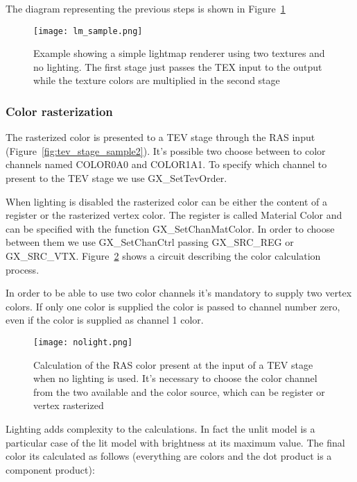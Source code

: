 \documentclass[12pt]{article}
\newcommand{\fname}[1] {{\color{blue}#1}}
\begin{document}
The diagram representing the previous steps is shown in Figure~\ref{fig:lm_sample}


\begin{figure}[ht]
\centering
\texttt{[image: lm\_sample.png]}
\caption{Example showing a simple lightmap renderer using two textures and no lighting. The first stage just passes the TEX input to the output while the texture colors are multiplied in the second stage}
\label{fig:lm_sample}
\end {figure}

\pagebreak
\subsubsection{ Color rasterization }

The rasterized color is presented to a TEV stage through the RAS input (Figure~\ref{fig:tev_stage_sample2}). It's possible two choose between to color channels named COLOR0A0 and COLOR1A1. To specify which channel to present to the TEV stage we use \fname{GX\_SetTevOrder}.

When lighting is disabled the rasterized color can be either the content of a register or the rasterized vertex color. The register is called Material Color and can be specified with the function \fname{GX\_SetChanMatColor}. In order to choose between them we use \fname{GX\_SetChanCtrl} passing GX\_SRC\_REG or GX\_SRC\_VTX. Figure~\ref{fig:nolight} shows a circuit describing the color calculation process.

In order to be able to use two color channels it's mandatory to supply two vertex colors. If only one color is supplied the color is passed to channel number zero, even if the color is supplied as channel 1 color.

\begin{figure}[ht]
\centering
\texttt{[image: nolight.png]}
\caption{Calculation of the RAS color present at the input of a TEV stage when no lighting is used. It's necessary to choose the color channel from the two available and the color source, which can be register or vertex rasterized}
\label{fig:nolight}
\end {figure}

Lighting adds complexity to the calculations. In fact the unlit model is a particular case of the lit model with brightness at its maximum value. The final color its calculated as follows (everything are colors and the dot product is a component product):
\end{document}
